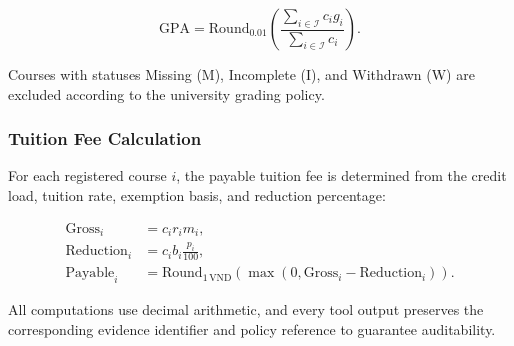 \begin{equation}
  \mathrm{GPA}
  =\mathrm{Round}_{0.01}\!\left(
     \frac{\sum_{i\in\mathcal{I}}c_i g_i}
          {\sum_{i\in\mathcal{I}}c_i}
   \right).
\label{eq:gpa}
\end{equation}

Courses with statuses Missing (M), Incomplete (I), and Withdrawn (W) are excluded according to the university grading policy.

\subsubsection{Tuition Fee Calculation}

For each registered course $i$, the payable tuition fee is determined from the credit load, tuition rate, exemption basis, and reduction percentage:

\begin{align}
  \mathrm{Gross}_i &= c_i r_i m_i,\\
  \mathrm{Reduction}_i &= c_i b_i\frac{p_i}{100},\\
  \mathrm{Payable}_i &=
  \mathrm{Round}_{1\,\mathrm{VND}}
  \left(\max(0,\mathrm{Gross}_i-\mathrm{Reduction}_i)\right).
\label{eq:tuition-payable}
\end{align}

All computations use decimal arithmetic, and every tool output preserves the corresponding evidence identifier and policy reference to guarantee auditability.
